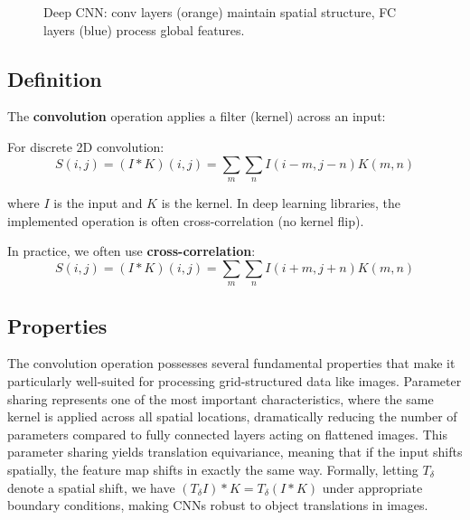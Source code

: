 \begin{figure}[h]
\caption{Deep CNN: conv layers (orange) maintain spatial structure, FC layers (blue) process global features.}
\label{fig:deep-cnn-architecture}
\end{figure}

\subsection{Definition}

The \textbf{convolution} operation applies a filter (kernel) across an input:

For discrete 2D convolution:
\begin{equation}
S(i,j) = (I * K)(i,j) = \sum_m \sum_n I(i-m, j-n) K(m, n)
\end{equation}

where $I$ is the input and $K$ is the kernel. In deep learning libraries, the implemented operation is often cross-correlation (no kernel flip).

In practice, we often use \textbf{cross-correlation}:
\begin{equation}
S(i,j) = (I * K)(i,j) = \sum_m \sum_n I(i+m, j+n) K(m, n)
\end{equation}

\subsection{Properties}

The convolution operation possesses several fundamental properties that make it particularly well-suited for processing grid-structured data like images. Parameter sharing represents one of the most important characteristics, where the same kernel is applied across all spatial locations, dramatically reducing the number of parameters compared to fully connected layers acting on flattened images. This parameter sharing yields translation equivariance, meaning that if the input shifts spatially, the feature map shifts in exactly the same way. Formally, letting \(T_\delta\) denote a spatial shift, we have \((T_\delta I) * K = T_\delta (I * K)\) under appropriate boundary conditions, making CNNs robust to object translations in images.

